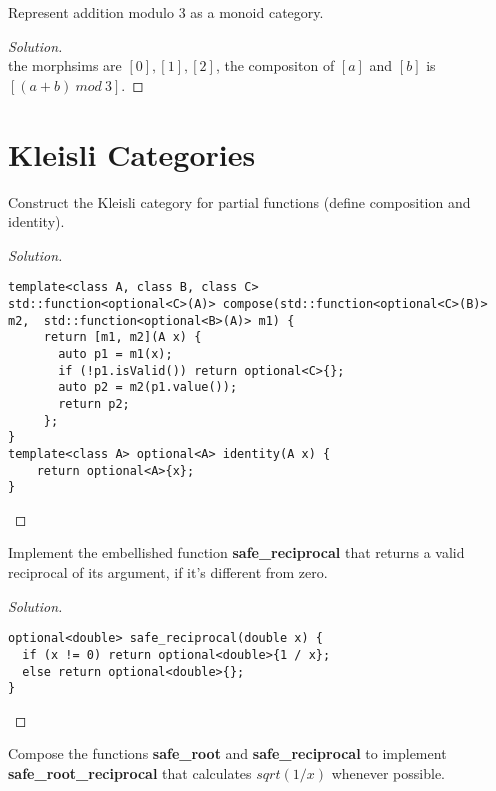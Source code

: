 \documentclass[7x10,thmnumcontwithchapter,WebLink,AddlevelTwoTOC,NumRef,BookEndNote,printer]{pupbook}
\begin{document}
\begin{exercise}
Represent addition modulo 3 as a monoid category.
\end{exercise}

\begin{proof}[Solution]
~\\
the morphsims are $[0] , [1] , [2]$,  the compositon of $[a]$ and $[b]$ is $[(a+b) \ mod \ 3]$.
\end{proof}



\chapter[Kleisli Categories]{Kleisli Categories\thefootnote}

\begin{exercise}
Construct the Kleisli category for partial functions (define composition and identity).
\end{exercise}

\begin{proof}[Solution]
~\\
\begin{lstlisting}
template<class A, class B, class C> 
std::function<optional<C>(A)> compose(std::function<optional<C>(B)> m2,  std::function<optional<B>(A)> m1) {
     return [m1, m2](A x) {
       auto p1 = m1(x);
       if (!p1.isValid()) return optional<C>{};
       auto p2 = m2(p1.value());
       return p2;
     };
}
template<class A> optional<A> identity(A x) {
    return optional<A>{x};
}
\end{lstlisting}	
\end{proof}



\begin{exercise}
Implement the embellished function \textbf{safe\_reciprocal} that returns a valid reciprocal of its argument, if it’s different from zero.
\end{exercise}


\begin{proof}[Solution]
~\\
\begin{lstlisting}
optional<double> safe_reciprocal(double x) {
  if (x != 0) return optional<double>{1 / x};
  else return optional<double>{};
}
\end{lstlisting}
\end{proof}


\begin{exercise}
Compose the functions \textbf{safe\_root} and \textbf{safe\_reciprocal} to implement \textbf{safe\_root\_reciprocal} that calculates $sqrt(1/x)$ whenever possible.
\end{exercise}
\end{document}

